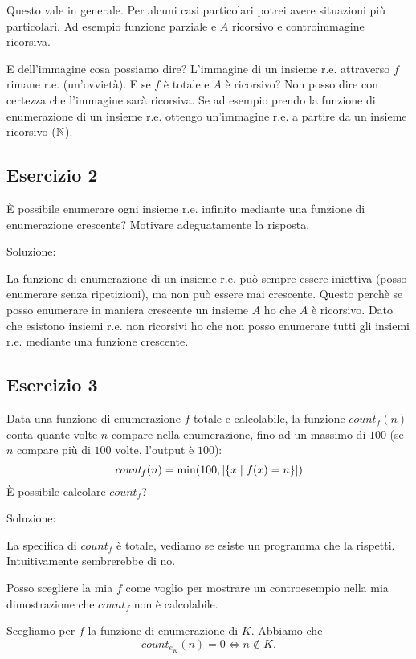 Questo vale in generale. Per alcuni casi particolari potrei avere situazioni più particolari. Ad
esempio funzione parziale e $A$ ricorsivo e controimmagine ricorsiva.

E dell'immagine cosa possiamo dire? L'immagine di un insieme r.e. attraverso $f$ rimane r.e.
(un'ovvietà). E se $f$ è totale e $A$ è ricorsivo? Non posso dire con certezza che l'immagine
sarà ricorsiva. Se ad esempio prendo la funzione di enumerazione di un insieme r.e. ottengo
un'immagine r.e. a partire da un insieme ricorsivo ($\mathbb{N}$).

\subsection{Esercizio 2}

È possibile enumerare ogni insieme r.e. infinito mediante una funzione di enumerazione crescente?
Motivare adeguatamente la risposta.

Soluzione:

La funzione di enumerazione di un insieme r.e. può sempre essere iniettiva (\ie posso enumerare
senza ripetizioni), ma non può essere mai crescente. Questo perchè se posso enumerare in maniera
crescente un insieme $A$ ho che $A$ è ricorsivo. Dato che esistono insiemi r.e. non ricorsivi ho che
non posso enumerare tutti gli insiemi r.e. mediante una funzione crescente.

\subsection{Esercizio 3}

Data una funzione di enumerazione $f$ totale e calcolabile, la funzione $\textit{count}_{f}(n)$ conta quante
volte $n$ compare nella enumerazione, fino ad un massimo di $100$ (se $n$ compare più di $100$ volte, l’output
è $100$):
\begin{equation*}
    \textit{count}_{f}(n) = \min(100,|\{x \mid f(x) = n\}|)
\end{equation*}
È possibile calcolare $\textit{count}_{f}$?

Soluzione:

La specifica di $\textit{count}_{f}$ è totale, vediamo se esiste un programma che la rispetti.
Intuitivamente sembrerebbe di no.

Posso scegliere la mia $f$ come voglio per mostrare un controesempio nella mia dimostrazione che
$\textit{count}_{f}$ non è calcolabile.

Scegliamo per $f$ la funzione di enumerazione di $K$. Abbiamo che
\begin{equation*}
    count_{e_{K}}(n) = 0 \iff n \notin K.
\end{equation*}


